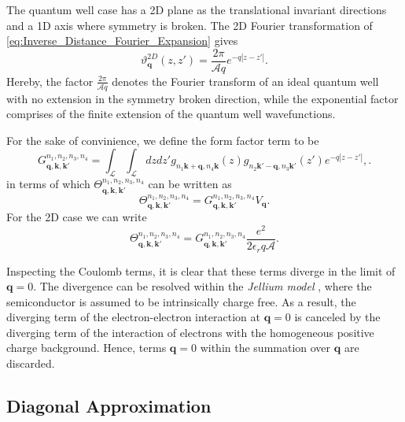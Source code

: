 The quantum well case has a 2D plane as the translational invariant
directions and a 1D axis where symmetry is broken. The 2D Fourier
transformation of \ref{eq:Inverse_Distance_Fourier_Expansion} gives\begin{equation}
\vartheta_{\mathbf{q}}^{2D}(z,z')=\frac{2\pi}{\mathcal{A}q}e^{-q\left|z-z'\right|}.\label{eq:2D_Form_Factor}\end{equation}
Hereby, the factor $\frac{2\pi}{\mathcal{A}q}$ denotes the Fourier
transform of an ideal quantum well with no extension in the symmetry
broken direction, while the exponential factor comprises of the finite
extension of the quantum well wavefunctions. 

For the sake of convinience, we define the form factor term to be
\begin{equation}
G_{\mathbf{q},\mathbf{k},\mathbf{k}'}^{n_{1},n_{2},n_{3},n_{4}}=\int_{\mathcal{L}}\int_{\mathcal{L}}dzdz'g_{n_{1}\mathbf{k}+\mathbf{q},n_{4}\mathbf{k}}(z)g_{n_{2}\mathbf{k}'-\mathbf{q},n_{3}\mathbf{k}'}(z')e^{-q\left|z-z'\right|},.\end{equation}
in terms of which $\Theta_{\mathbf{q},\mathbf{k},\mathbf{k}'}^{n_{1},n_{2},n_{3},n_{4}}$
can be written as\begin{equation}
\Theta_{\mathbf{q},\mathbf{k},\mathbf{k}'}^{n_{1},n_{2},n_{3},n_{4}}=G_{\mathbf{q},\mathbf{k},\mathbf{k}'}^{n_{1},n_{2},n_{3},n_{4}}V_{\mathbf{q}}.\label{eq:Coulomb_Interaction_Alternative}\end{equation}
For the 2D case we can write \begin{equation}
\Theta_{\mathbf{q},\mathbf{k},\mathbf{k}'}^{n_{1},n_{2},n_{3},n_{4}}=G_{\mathbf{q},\mathbf{k},\mathbf{k}'}^{n_{1},n_{2},n_{3},n_{4}}\frac{e^{2}}{2\epsilon_{r}q\mathcal{A}}.\label{eq:Coulomb_Interaction_Alternative_2D}\end{equation}


Inspecting the Coulomb terms, it is clear that these terms diverge
in the limit of $\mathbf{q}=0$. The divergence can be resolved within
the \emph{Jellium model} \citet{Haug2009}, where the semiconductor
is assumed to be intrinsically charge free. As a result, the diverging
term of the electron-electron interaction at $\mathbf{q}=0$ is canceled
by the diverging term of the interaction of electrons with the homogeneous
positive charge background. Hence, terms $\mathbf{q}=0$ within the
summation over $\mathbf{q}$ are discarded.


\subsection{Diagonal Approximation}

